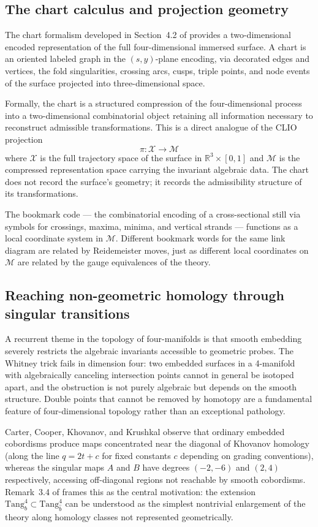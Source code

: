 \documentclass[12pt, a4paper]{article}
\theoremstyle{plain}
\theoremstyle{definition}
\theoremstyle{correspondence}
\newcommand{\RR}{\mathbb{R}}
\newcommand{\calX}{\mathcal{X}}
\newcommand{\calM}{\mathcal{M}}
\newcommand{\Tang}{\mathrm{Tang}}
\begin{document}
\subsection{The chart calculus and projection geometry}

The chart formalism developed in Section~4.2 of \cite{CCKK25} provides a two-dimensional
encoded representation of the full four-dimensional immersed surface. A chart is an
oriented labeled graph in the $(s,y)$-plane encoding, via decorated edges and vertices,
the fold singularities, crossing arcs, cusps, triple points, and node events of the
surface projected into three-dimensional space.

Formally, the chart is a structured compression of the four-dimensional process into a
two-dimensional combinatorial object retaining all information necessary to reconstruct
admissible transformations. This is a direct analogue of the CLIO projection
\[
\pi : \calX \to \calM
\]
where $\calX$ is the full trajectory space of the surface in $\RR^3 \times [0,1]$ and
$\calM$ is the compressed representation space carrying the invariant algebraic data.
The chart does not record the surface's geometry; it records the admissibility structure
of its transformations.

The bookmark code --- the combinatorial encoding of a cross-sectional still via symbols
for crossings, maxima, minima, and vertical strands --- functions as a local coordinate
system in $\calM$. Different bookmark words for the same link diagram are related by
Reidemeister moves, just as different local coordinates on $\calM$ are related by the
gauge equivalences of the theory.

\subsection{Reaching non-geometric homology through singular transitions}

A recurrent theme in the topology of four-manifolds is that smooth embedding severely
restricts the algebraic invariants accessible to geometric probes. The Whitney trick
fails in dimension four: two embedded surfaces in a 4-manifold with algebraically
canceling intersection points cannot in general be isotoped apart, and the obstruction
is not purely algebraic but depends on the smooth structure. Double points that cannot
be removed by homotopy are a fundamental feature of four-dimensional topology rather
than an exceptional pathology.

Carter, Cooper, Khovanov, and Krushkal observe that ordinary embedded cobordisms
produce maps concentrated near the diagonal of Khovanov homology (along the line
$q = 2t + c$ for fixed constants $c$ depending on grading conventions), whereas the
singular maps $A$ and $B$ have degrees $(-2,-6)$ and $(2,4)$ respectively, accessing
off-diagonal regions not reachable by smooth cobordisms. Remark~3.4 of \cite{CCKK25}
frames this as the central motivation: the extension $\Tang^4_b \subset \Tang^4_{\hat{b}}$
can be understood as the simplest nontrivial enlargement of the theory along homology
classes not represented geometrically.
\end{document}

